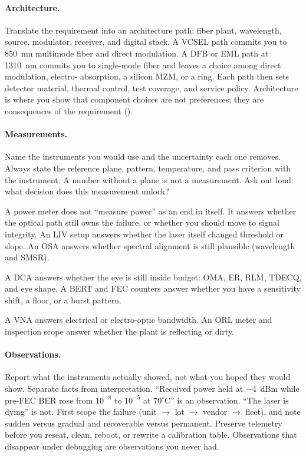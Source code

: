 \paragraph{Architecture.}
Translate the requirement into an architecture path: fiber plant, wavelength,
source, modulator, receiver, and digital stack. A VCSEL path
commits you to 850~nm multimode fiber and direct modulation. A
DFB or EML path at 1310~nm commits you to
single-mode fiber and leaves a choice among direct modulation, electro-
absorption, a silicon MZM, or a ring. Each path
then sets detector material, thermal control, test coverage, and service
policy. Architecture is where you show that component choices are not
preferences; they are consequences of the requirement
().

\paragraph{Measurements.}
Name the instruments you would use and the uncertainty each one removes.
Always state the reference plane, pattern, temperature, and pass criterion
with the instrument. A number without a plane is not a measurement. Ask out
loud: what decision does this measurement unlock?

A power meter does not ``measure power'' as an end in itself. It answers
whether the optical path still owns the failure, or whether you should move to
signal integrity. An LIV setup answers whether the laser itself
changed threshold or slope. An OSA answers whether spectral
alignment is still plausible (wavelength and SMSR).

A DCA answers whether the eye is still inside budget:
OMA, ER, RLM,
TDECQ, and eye shape. A BERT and
FEC counters answer whether you have a sensitivity shift, a
floor, or a burst pattern.

A VNA answers electrical or electro-optic bandwidth. An
ORL meter and inspection scope answer whether the plant is
reflecting or dirty.

\paragraph{Observations.}
Report what the instruments actually showed, not what you hoped they would
show. Separate facts from interpretation. ``Received power held at
$-4$~dBm while pre-FEC BER rose from $10^{-8}$ to $10^{-5}$ at $70^\circ$C''
is an observation. ``The laser is dying'' is not. First scope the failure
(unit $\rightarrow$ lot $\rightarrow$ vendor $\rightarrow$ fleet), and note
sudden versus gradual and recoverable versus permanent. Preserve telemetry
before you reseat, clean, reboot, or rewrite a calibration table.
Observations that disappear under debugging are observations you never had.

